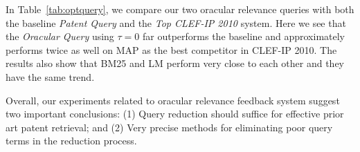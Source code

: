 In Table~\ref{tab:optquery}, we compare our two oracular relevance
queries with both the baseline \emph{Patent Query} and the \emph{Top
CLEF-IP 2010} system.  Here we see that
the {\em Oracular Query} using $\tau=0$ far outperforms the baseline and
approximately performs twice as well on MAP as the best competitor in
CLEF-IP 2010. The results also show that BM25 and LM perform very close to each other and they have the same trend.

%
%


Overall, our experiments related to oracular relevance feedback system
suggest two important conclusions: (1) Query reduction should suffice for effective prior art patent retrieval; and (2) Very precise methods for eliminating poor query terms in the reduction process.


